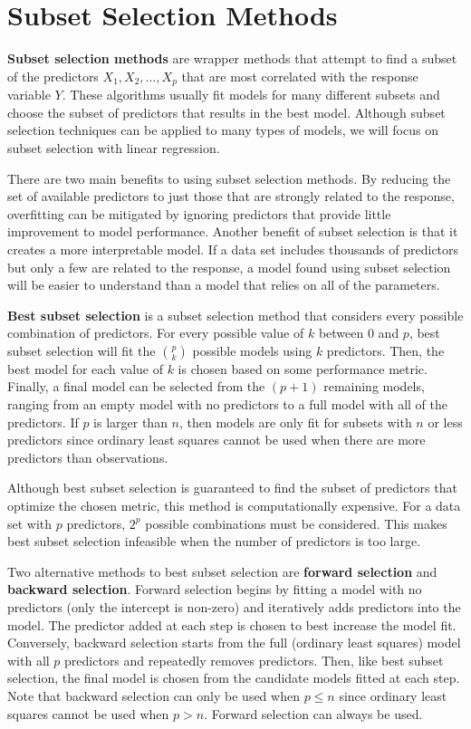 \documentclass{article}
\begin{document}
\section{Subset Selection Methods}

\textbf{Subset selection methods} are wrapper methods that attempt to find a subset of the predictors $X_1, X_2, \dotsc, X_p$ that are most correlated with the response variable $Y$. These algorithms usually fit models for many different subsets and choose the subset of predictors that results in the best model. Although subset selection techniques can be applied to many types of models, we will focus on subset selection with linear regression.

There are two main benefits to using subset selection methods. By reducing the set of available predictors to just those that are strongly related to the response, overfitting can be mitigated by ignoring predictors that provide little improvement to model performance. Another benefit of subset selection is that it creates a more interpretable model. If a data set includes thousands of predictors but only a few are related to the response, a model found using subset selection will be easier to understand than a model that relies on all of the parameters. 

\textbf{Best subset selection} is a subset selection method that considers every possible combination of predictors. For every possible value of $k$ between 0 and $p$, best subset selection will fit the ${p\choose k}$ possible models using $k$ predictors. Then, the best model for each value of $k$ is chosen based on some performance metric. Finally, a final model can be selected from the $(p + 1)$ remaining models, ranging from an empty model with no predictors to a full model with all of the predictors. If $p$ is larger than $n$, then models are only fit for subsets with $n$ or less predictors since ordinary least squares cannot be used when there are more predictors than observations.

Although best subset selection is guaranteed to find the subset of predictors that optimize the chosen metric, this method is computationally expensive. For a data set with $p$ predictors, $2^p$ possible combinations must be considered. This makes best subset selection infeasible when the number of predictors is too large.

Two alternative methods to best subset selection are \textbf{forward selection} and \textbf{backward selection}. Forward selection begins by fitting a model with no predictors (only the intercept is non-zero) and iteratively adds predictors into the model. The predictor added at each step is chosen to best increase the model fit. Conversely, backward selection starts from the full (ordinary least squares) model with all $p$ predictors and repeatedly removes predictors. Then, like best subset selection, the final model is chosen from the candidate models fitted at each step. Note that backward selection can only be used when $p\leq n$ since ordinary least squares cannot be used when $p>n$. Forward selection can always be used.
\end{document}
